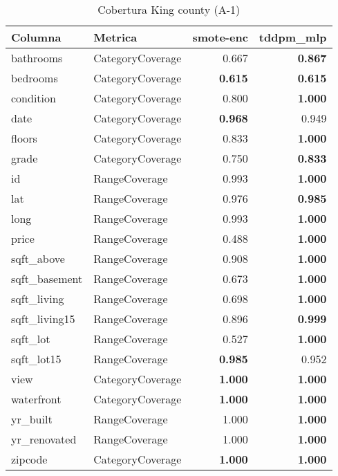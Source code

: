 \begin{table}[H]
\centering
\caption{Cobertura King county (A-1)}
\label{table-coverage-king county-a-1}
\begin{tabular}{|l|l|r|r|}
\hline
\rowcolor[gray]{0.8}
Columna & Metrica & smote-enc & tddpm\_mlp \\
\hline bathrooms & CategoryCoverage & 0.667 & \bfseries 0.867 \\
\hline bedrooms & CategoryCoverage & \bfseries 0.615 & \bfseries 0.615 \\
\hline condition & CategoryCoverage & 0.800 & \bfseries 1.000 \\
\hline date & CategoryCoverage & \bfseries 0.968 & 0.949 \\
\hline floors & CategoryCoverage & 0.833 & \bfseries 1.000 \\
\hline grade & CategoryCoverage & 0.750 & \bfseries 0.833 \\
\hline id & RangeCoverage & 0.993 & \bfseries 1.000 \\
\hline lat & RangeCoverage & 0.976 & \bfseries 0.985 \\
\hline long & RangeCoverage & 0.993 & \bfseries 1.000 \\
\hline price & RangeCoverage & 0.488 & \bfseries 1.000 \\
\hline sqft\_above & RangeCoverage & 0.908 & \bfseries 1.000 \\
\hline sqft\_basement & RangeCoverage & 0.673 & \bfseries 1.000 \\
\hline sqft\_living & RangeCoverage & 0.698 & \bfseries 1.000 \\
\hline sqft\_living15 & RangeCoverage & 0.896 & \bfseries 0.999 \\
\hline sqft\_lot & RangeCoverage & 0.527 & \bfseries 1.000 \\
\hline sqft\_lot15 & RangeCoverage & \bfseries 0.985 & 0.952 \\
\hline view & CategoryCoverage & \bfseries 1.000 & \bfseries 1.000 \\
\hline waterfront & CategoryCoverage & \bfseries 1.000 & \bfseries 1.000 \\
\hline yr\_built & RangeCoverage & 1.000 & \bfseries 1.000 \\
\hline yr\_renovated & RangeCoverage & 1.000 & \bfseries 1.000 \\
\hline zipcode & CategoryCoverage & \bfseries 1.000 & \bfseries 1.000 \\
\hline
\end{tabular}
\end{table}
